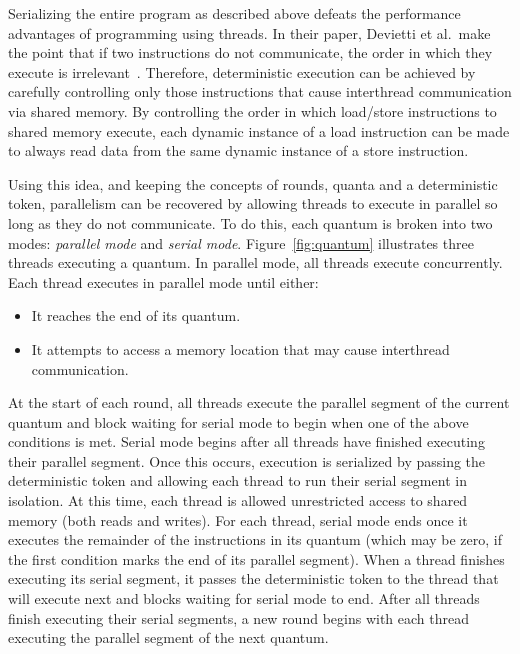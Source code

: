 Serializing the entire program as described above defeats the
performance advantages of programming using threads.  In their paper,
Devietti et al.\ make the point that if two instructions do not
communicate, the order in which they execute is irrelevant~\cite{dmp}.
Therefore, deterministic execution can be achieved by carefully
controlling only those instructions that cause interthread
communication via shared memory.  By controlling the order in which
load/store instructions to shared memory execute, each dynamic
instance of a load instruction can be made to always read data from
the same dynamic instance of a store instruction.

Using this idea, and keeping the concepts of rounds, quanta and a
deterministic token, parallelism can be recovered by allowing threads
to execute in parallel so long as they do not communicate.  To do
this, each quantum is broken into two modes: \emph{parallel mode} and
\emph{serial mode}.  Figure~\ref{fig:quantum} illustrates three
threads executing a quantum.  In parallel mode, all threads execute
concurrently.  Each thread executes in parallel mode until either:

\begin{itemize}
\item It reaches the end of its quantum.

\item It attempts to access a memory location that may cause
  interthread communication.
\end{itemize}

At the start of each round, all threads execute the parallel segment
of the current quantum and block waiting for serial mode to begin when
one of the above conditions is met.  Serial mode begins after all
threads have finished executing their parallel segment.  Once this
occurs, execution is serialized by passing the deterministic token and
allowing each thread to run their serial segment in isolation.  At
this time, each thread is allowed unrestricted access to shared memory
(both reads and writes).  For each thread, serial mode ends once it
executes the remainder of the instructions in its quantum (which may
be zero, if the first condition marks the end of its parallel
segment).  When a thread finishes executing its serial segment, it
passes the deterministic token to the thread that will execute next
and blocks waiting for serial mode to end.  After all threads finish
executing their serial segments, a new round begins with each thread
executing the parallel segment of the next quantum.

